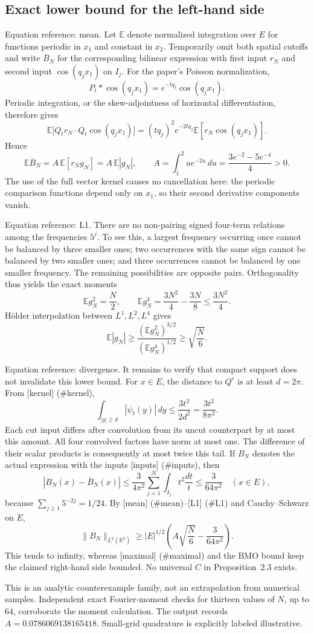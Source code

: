 \documentclass[10pt]{article}
\begin{document}
\subsection*{Exact lower bound for the left-hand side}
Equation reference: mean. Let \(\mathbb E\) denote normalized integration over \(E\) for functions periodic in \(x_1\) and constant in \(x_2\). Temporarily omit both spatial cutoffs and write \(\overline B_N\) for the corresponding bilinear expression with first input \(r_N\) and second input \(\cos(q_jx_1)\) on \(I_j\). For the paper’s Poisson normalization, \[P_t*\cos(q_jx_1)=e^{-tq_j}\cos(q_jx_1).\] Periodic integration, or the skew-adjointness of horizontal differentiation, therefore gives \[\mathbb E\big[Q_tr_N\cdot Q_t\cos(q_jx_1)\big]
 =(tq_j)^2e^{-2tq_j}\mathbb E[r_N\cos(q_jx_1)].\] Hence \[
 \mathbb E\overline B_N
 =A\,\mathbb E[r_Ng_N]
 =A\,\mathbb E|g_N|,
 \qquad
 A=\int_1^2u e^{-2u}\,du=\frac{3e^{-2}-5e^{-4}}4>0.\] The use of the full vector kernel causes no cancellation here: the periodic comparison functions depend only on \(x_1\), so their second derivative components vanish.\par
Equation reference: L1. There are no non-pairing signed four-term relations among the frequencies \(5^j\). To see this, a largest frequency occurring once cannot be balanced by three smaller ones; two occurrences with the same sign cannot be balanced by two smaller ones; and three occurrences cannot be balanced by one smaller frequency. The remaining possibilities are opposite pairs. Orthogonality thus yields the exact moments \[\mathbb Eg_N^2=\frac N2,\qquad
 \mathbb Eg_N^4=\frac{3N^2}{4}-\frac{3N}{8}\le\frac{3N^2}{4}.\] Hölder interpolation between \(L^1,L^2,L^4\) gives \[
 \mathbb E|g_N|\ge
 \frac{(\mathbb Eg_N^2)^{3/2}}{(\mathbb Eg_N^4)^{1/2}}
 \ge\sqrt{\frac N6}.\]\par
Equation reference: divergence. It remains to verify that compact support does not invalidate this lower bound. For \(x\in E\), the distance to \(Q^c\) is at least \(d=2\pi\). From [kernel] (\#kernel), \[\int_{|y|\ge d}|\psi_t(y)|\,dy\le \frac{3t^2}{2d^2}
 =\frac{3t^2}{8\pi^2}.\] Each cut input differs after convolution from its uncut counterpart by at most this amount. All four convolved factors have norm at most one. The difference of their scalar products is consequently at most twice this tail. If \(B_N\) denotes the actual expression with the inputs [inputs] (\#inputs), then \[|B_N(x)-\overline B_N(x)|
 \le\frac{3}{4\pi^2}\sum_{j=1}^N\int_{I_j}t^2\frac{dt}{t}
 \le\frac{3}{64\pi^2}\quad(x\in E),\] because \(\sum_{j\ge1}5^{-2j}=1/24\). By [mean] (\#mean)–[L1] (\#L1) and Cauchy–Schwarz on \(E\), \[
 \|B_N\|_{L^2(\mathbb R^2)}
 \ge |E|^{1/2}\left(A\sqrt{\frac N6}-\frac{3}{64\pi^2}\right).\] This tends to infinity, whereas [maximal] (\#maximal) and the BMO bound keep the claimed right-hand side bounded. No universal \(C\) in Proposition 2.3 exists.\par
This is an analytic counterexample family, not an extrapolation from numerical samples. Independent exact Fourier-moment checks for thirteen values of \(N\), up to \(64\), corroborate the moment calculation. The output records \(A=0.0786069138165418\). Small-grid quadrature is explicitly labeled illustrative.\par
\end{document}

